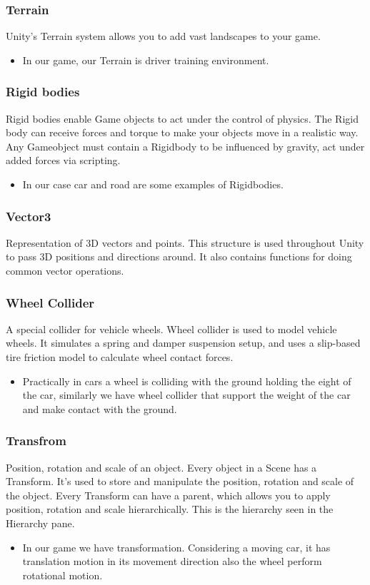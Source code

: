 \documentclass[12pt,a4paper]{article}
\begin{document}
\begin{center}
\begin{center}
\subsubsection*{Terrain}
Unity’s Terrain system allows you to add vast landscapes to your game.
\begin{itemize}
\item 
In our game, our Terrain is driver training environment.

\end{itemize}
\subsubsection*{Rigid bodies}
Rigid bodies enable Game objects to act under the control of physics. The Rigid body can receive forces and torque to make your objects move in a realistic way. Any Gameobject must contain a Rigidbody to be influenced by gravity, act under added forces via scripting. 
\begin{itemize}
\item 
In our case car and road are some examples of Rigidbodies.

\end{itemize}
\subsubsection*{Vector3}
Representation of 3D vectors and points. This structure is used throughout Unity to pass 3D positions and directions around. It also contains functions for doing common vector operations.
\subsubsection*{Wheel Collider}
A special collider for vehicle wheels. Wheel collider is used to model vehicle wheels. It simulates a spring and damper suspension setup, and uses a slip-based tire friction model to calculate wheel contact forces. 

\begin{itemize}
\item 
Practically in cars a wheel is colliding with the ground holding the eight of the car, similarly we have wheel collider that support the weight of the car and make contact with the ground.

\end{itemize}
\subsubsection*{Transfrom}
Position, rotation and scale of an object. Every object in a Scene has a Transform. It's used to store and manipulate the position, rotation and scale of the object. Every Transform can have a parent, which allows you to apply position, rotation and scale hierarchically. This is the hierarchy seen in the Hierarchy pane. 
\begin{itemize}
\item 
In our game we have transformation. Considering a moving car, it has translation motion in its movement direction also the wheel perform rotational motion.


\end{itemize}
\end{center}
\end{center}
\end{document}
